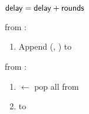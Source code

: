 \begin{bbox}[title={\textbf{Wrapper} $\Wasync$} ]
\begin{enumerate}
			\quad ${\mathsf {delay}} = {\mathsf {delay}} + {\mathsf {rounds}}$
	\end{enumerate}

\OnInput {} from \F:
	\begin{enumerate}
		\item Append (\F, ) to 
	\end{enumerate}

\OnInput {} from \Adversary:
	\begin{enumerate}
		\item {} $\leftarrow$ pop all from 
		\item \Send {} to \Adversary
	\end{enumerate}
\end{bbox}
